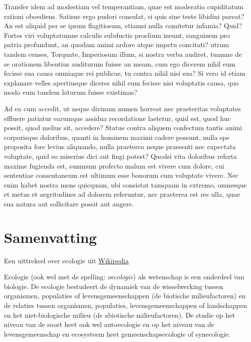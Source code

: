 \documentclass[twoside]{extreport}
\begin{document}
Transfer idem ad modestiam vel temperantiam, quae est moderatio
cupiditatum rationi oboediens. Satisne ergo pudori consulat, si quis
sine teste libidini pareat? An est aliquid per se ipsum flagitiosum,
etiamsi nulla comitetur infamia? Quid? Fortes viri voluptatumne calculis
subductis proelium ineunt, sanguinem pro patria profundunt, an quodam
animi ardore atque impetu concitati? utrum tandem censes, Torquate,
Imperiosum illum, si nostra verba audiret, tuamne de se orationem
libentius auditurum fuisse an meam, cum ego dicerem nihil eum fecisse
sua causa omniaque rei publicae, tu contra nihil nisi sua? Si vero id
etiam explanare velles apertiusque diceres nihil eum fecisse nisi
voluptatis causa, quo modo eum tandem laturum fuisse existimas?

Ad ea cum accedit, ut neque divinum numen horreat nec praeteritas
voluptates effluere patiatur earumque assidua recordatione laetetur,
quid est, quod huc possit, quod melius sit, accedere? Statue contra
aliquem confectum tantis animi corporisque doloribus, quanti in hominem
maximi cadere possunt, nulla spe proposita fore levius aliquando, nulla
praeterea neque praesenti nec expectata voluptate, quid eo miserius dici
aut fingi potest? Quodsi vita doloribus referta maxime fugienda est,
summum profecto malum est vivere cum dolore, cui sententiae consentaneum
est ultimum esse bonorum eum voluptate vivere. Nec enim habet nostra
mens quicquam, ubi consistat tamquam in extremo, omnesque et metus et
aegritudines ad dolorem referuntur, nec praeterea est res ulla, quae sua
natura aut sollicitare possit aut angere.

\bdutch

\hypertarget{samenvatting}{%
\chapter*{Samenvatting}\label{samenvatting}}

Een uittreksel over ecologie uit
\href{https://nl.wikipedia.org/wiki/Ecologie}{Wikipedia}

Ecologie (ook wel met de spelling: \emph{oecologie}) als wetenschap is
een onderdeel van biologie. De ecologie bestudeert de dynamiek van de
wisselwerking tussen organismen, populaties of levensgemeenschappen (de
biotische milieufactoren) en de relaties tussen organismen, populaties,
levensgemeenschappen of landschappen en het niet-biologische milieu (de
abiotische milieufactoren). De studie op het niveau van de soort heet
ook wel autoecologie en op het niveau van de levensgemeenschap en
ecosysteem heet gemeenschapsecologie of synecologie.
\end{document}
